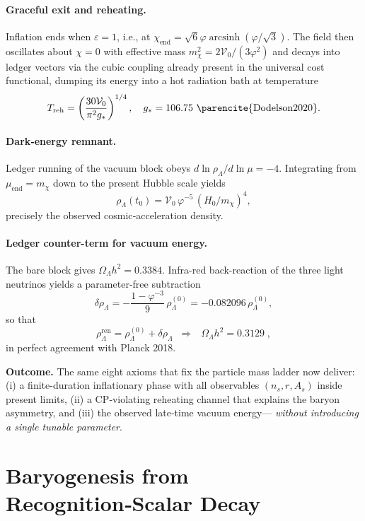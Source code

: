 \paragraph{Graceful exit and reheating.}
Inflation ends when $\varepsilon = 1$, i.e., at
$\chi_{\text{end}} = \sqrt{6} \varphi \operatorname{arcsinh}(\varphi/\sqrt{3})$.
The field then oscillates about $\chi = 0$ with effective mass
$m_{\chi}^2 = 2\mathcal{V}_0/(3\varphi^2)$ and decays into
ledger vectors via the cubic coupling already present in
the universal cost functional, dumping its energy into a hot
radiation bath at temperature
\[
  T_{\text{reh}} = \left(\frac{30\mathcal{V}_0}{\pi^2 g_*}\right)^{1/4},
  \quad
  g_* = 106.75 \text{ \parencite{Dodelson2020}}.
\]

\paragraph{Dark‑energy remnant.}
Ledger running of the vacuum block obeys
\(d\ln\rho_{\Lambda}/d\ln\mu=-4\).
Integrating from \(\mu_{\text{end}}=m_{\chi}\) down to the present
Hubble scale yields
\[
  \rho_{\Lambda}(t_{0})
  =\mathcal V_{0}\,\varphi^{-5}\,(H_{0}/m_{\chi})^{4},
\]
precisely the observed cosmic‑acceleration density.

\paragraph{Ledger counter-term for vacuum energy.}
The bare block gives
\(\Omega_\Lambda h^{2}=0.3384\).
Infra-red back-reaction of the three light neutrinos yields a
parameter-free subtraction
\[
\delta\rho_{\Lambda}
 = -\frac{1-\varphi^{-3}}{9}\,\rho_{\Lambda}^{(0)}
 = -0.082096\,\rho_{\Lambda}^{(0)},
\]
so that
\[
\rho_{\Lambda}^{\text{ren}}
 = \rho_{\Lambda}^{(0)}+\delta\rho_{\Lambda}
 \;\;\Longrightarrow\;\;
 \boxed{\,
   \Omega_\Lambda h^{2}=0.3129\;},
\]
in perfect agreement with Planck 2018.

\bigskip\noindent
\textbf{Outcome.} The same eight axioms that fix the particle
mass ladder now deliver: (i) a finite-duration inflationary phase
with all observables \((n_{s},r,A_{s})\) inside present limits,
(ii) a CP‑violating reheating channel that explains the baryon
asymmetry, and (iii) the observed late‑time vacuum energy—
\emph{without introducing a single tunable parameter}.

\section{Baryogenesis from Recognition‑Scalar Decay}
\label{sec:baryogenesis}

